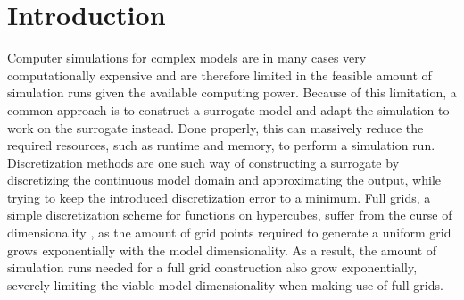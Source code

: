 \documentclass[
  a4paper,  %
  twoside,  %
  bibliography=totoc,
  headsepline,
  cleardoublepage=empty,
  parskip=half,
  draft=false
]{scrbook}
\begin{document}
\renewcommand*{\chapterpagestyle}{scrplain}
\pagestyle{scrheadings}
\pagestyle{scrheadings}
\ihead[]{}
\chead[]{}
\ohead[]{\headmark}
\cfoot[]{}
\ifoot[]{}

































%
%


\chapter{Introduction}
\label{chap:c1}

\setcounter{page}{1}

Computer simulations for complex models are in many cases very computationally expensive and are therefore limited in the feasible amount of simulation runs given the available computing power.
Because of this limitation, a common approach is to construct a surrogate model and adapt the simulation to work on the surrogate instead.
Done properly, this can massively reduce the required resources, such as runtime and memory, to perform a simulation run.
Discretization methods \cite{Stetter1973} are one such way of constructing a surrogate by discretizing the continuous model domain and approximating the output, while trying to keep the introduced discretization error to a minimum.
Full grids, a simple discretization scheme for functions on hypercubes, suffer from the curse of dimensionality \cite{Bellman1961}, as the amount of grid points required to generate a uniform grid grows exponentially with the model dimensionality.
As a result, the amount of simulation runs needed for a full grid construction also grow exponentially, severely limiting the viable model dimensionality when making use of full grids.
\end{document}
